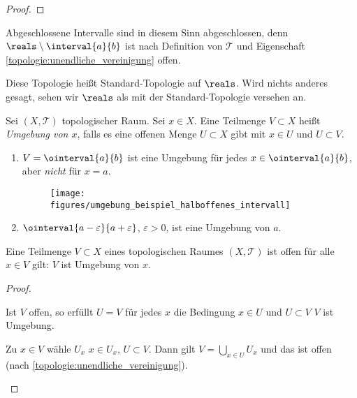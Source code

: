 \begin{beispiele}
\begin{enumerate}
\begin{proof}
            
        \end{proof}
        Abgeschlossene Intervalle sind in diesem Sinn abgeschlossen, denn \( \reals\setminus \interval{a}{b} \) ist nach Definition von \( \mathcal{T} \) und Eigenschaft \ref{topologie:unendliche_vereinigung} offen.

        Diese Topologie heißt Standard-Topologie auf \( \reals \). 
        Wird nichts anderes gesagt, sehen wir \(\reals \) als mit der Standard-Topologie versehen an.
    \end{enumerate}
\end{beispiele}
\begin{definition}\label{umgebung_in_topologischen_raeumen}
    Sei \( (X, \mathcal{T}) \) topologischer Raum. 
    Sei \( x\in X \). 
    Eine Teilmenge \( V\subset X \) heißt \emph{Umgebung von \( x \)}, falls es eine offenen Menge \( U\subset X \) gibt mit \( x\in U \) und \( U\subset V \).
\end{definition}
\begin{beispiele*}
    \begin{enumerate}
        \item \( V=\ointerval{a}{b} \) ist eine Umgebung für jedes \( x\in \ointerval{a}{b} \), aber \emph{nicht} für \( x=a \).
        \begin{figure}[H]
            \centering
            \texttt{[image: figures/umgebung\_beispiel\_halboffenes\_intervall]}
            \label{fig:umgebung_beispiel_halboffenes_intervall}
        \end{figure}
        
        \item \( \ointerval{a-\varepsilon}{a+\varepsilon} \),  \( \varepsilon>0 \), ist eine Umgebung von \( a \).         
    \end{enumerate}
\end{beispiele*}
\begin{lemma}\label{offene_menge_umgebung_aller_elemente}
    Eine Teilmenge \( V\subset X \) eines topologischen Raumes \( (X,\mathcal{T}) \) ist offen \gdw für alle \( x\in V \) gilt: \( V \) ist Umgebung von \( x \).
\end{lemma}
\begin{proof}
    \begin{proofdescription}
        
        \item[\hin] Ist \( V \) offen, so erfüllt \( U=V \) für jedes \( x \) die Bedingung \( x\in U \) und \( U\subset V \) \timplies \( V \) ist Umgebung.
        \item[\rueck] Zu \( x\in V \) wähle \( U_x \) \sd \( x\in U_x \), \( U\subset V \). 
        Dann gilt \( V=\bigcup_{x\in U} U_x \) und das ist offen (nach \ref{topologie:unendliche_vereinigung}).
    \end{proofdescription}
    
    
\end{proof}
